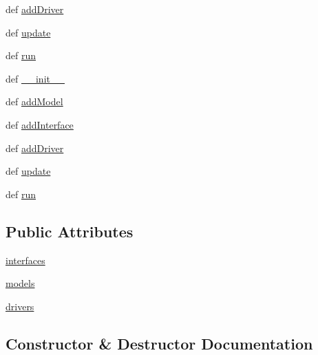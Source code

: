 \begin{DoxyCompactItemize}
\item 
def \hyperlink{classinterface_1_1INTERFACE__CORE_1_1interface_a54871907738176848a480584557cb65b}{add\+Driver}
\item 
def \hyperlink{classinterface_1_1INTERFACE__CORE_1_1interface_afca54b5f57d67ed5ba8b4dc110fa2647}{update}
\item 
def \hyperlink{classinterface_1_1INTERFACE__CORE_1_1interface_a2ba0b1d20f8ee0bf50b468bb82e91d4d}{run}
\item 
def \hyperlink{classinterface_1_1INTERFACE__CORE_1_1interface_a96fbbdd17999b9eb5430336f475c91ad}{\+\_\+\+\_\+init\+\_\+\+\_\+}
\item 
def \hyperlink{classinterface_1_1INTERFACE__CORE_1_1interface_a9e590fb5bf7673a7c77027f4ded29abb}{add\+Model}
\item 
def \hyperlink{classinterface_1_1INTERFACE__CORE_1_1interface_a7876b4f6147630ed64bde3864aed78c0}{add\+Interface}
\item 
def \hyperlink{classinterface_1_1INTERFACE__CORE_1_1interface_a54871907738176848a480584557cb65b}{add\+Driver}
\item 
def \hyperlink{classinterface_1_1INTERFACE__CORE_1_1interface_afca54b5f57d67ed5ba8b4dc110fa2647}{update}
\item 
def \hyperlink{classinterface_1_1INTERFACE__CORE_1_1interface_a2ba0b1d20f8ee0bf50b468bb82e91d4d}{run}
\end{DoxyCompactItemize}
\subsection*{Public Attributes}
\begin{DoxyCompactItemize}
\item 
\hyperlink{classinterface_1_1INTERFACE__CORE_1_1interface_a360e2dd2c4bc4c873884831bfaa86582}{interfaces}
\item 
\hyperlink{classinterface_1_1INTERFACE__CORE_1_1interface_a15823225e3f265a09e00938b28ac12da}{models}
\item 
\hyperlink{classinterface_1_1INTERFACE__CORE_1_1interface_accf9df0d1460957144aa70522fa66a6c}{drivers}
\end{DoxyCompactItemize}


\subsection{Constructor \& Destructor Documentation}
\hypertarget{classinterface_1_1INTERFACE__CORE_1_1interface_a96fbbdd17999b9eb5430336f475c91ad}{}
